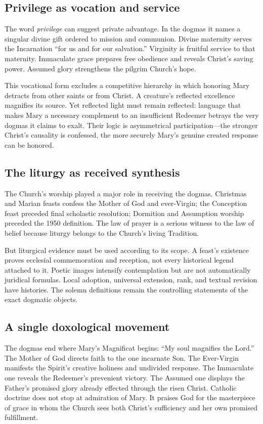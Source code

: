 \subsection{Privilege as vocation and service}

The word \emph{privilege} can suggest private advantage. In the dogmas it names a singular divine gift ordered to mission and communion. Divine maternity serves the Incarnation ``for us and for our salvation.'' Virginity is fruitful service to that maternity. Immaculate grace prepares free obedience and reveals Christ's saving power. Assumed glory strengthens the pilgrim Church's hope.

This vocational form excludes a competitive hierarchy in which honoring Mary detracts from other saints or from Christ. A creature's reflected excellence magnifies its source. Yet reflected light must remain reflected: language that makes Mary a necessary complement to an insufficient Redeemer betrays the very dogmas it claims to exalt. Their logic is asymmetrical participation---the stronger Christ's causality is confessed, the more securely Mary's genuine created response can be honored.

\subsection{The liturgy as received synthesis}

The Church's worship played a major role in receiving the dogmas. Christmas and Marian feasts confess the Mother of God and ever-Virgin; the Conception feast preceded final scholastic resolution; Dormition and Assumption worship preceded the 1950 definition. The law of prayer is a serious witness to the law of belief because liturgy belongs to the Church's living Tradition.

But liturgical evidence must be used according to its scope. A feast's existence proves ecclesial commemoration and reception, not every historical legend attached to it. Poetic images intensify contemplation but are not automatically juridical formulas. Local adoption, universal extension, rank, and textual revision have histories. The solemn definitions remain the controlling statements of the exact dogmatic objects.

\subsection{A single doxological movement}

The dogmas end where Mary's Magnificat begins: ``My soul magnifies the Lord.'' The Mother of God directs faith to the one incarnate Son. The Ever-Virgin manifests the Spirit's creative holiness and undivided response. The Immaculate one reveals the Redeemer's prevenient victory. The Assumed one displays the Father's promised glory already effected through the risen Christ. Catholic doctrine does not stop at admiration of Mary. It praises God for the masterpiece of grace in whom the Church sees both Christ's sufficiency and her own promised fulfillment.
